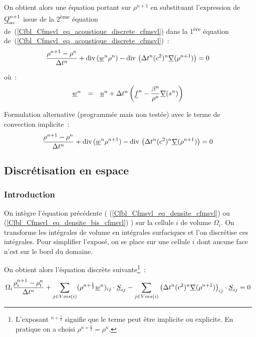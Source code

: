 On obtient alors une équation
portant sur $\rho^{n+1}$ en substituant l'expression de $\underline{Q}_{ac}^{n+1}$
issue de la 2\textsuperscript{ème} équation
de~(\ref{Cfbl_Cfmsvl_eq_acoustique_discrete_cfmsvl})
dans la 1\textsuperscript{ère} équation
de~(\ref{Cfbl_Cfmsvl_eq_acoustique_discrete_cfmsvl})~:
\begin{equation}\label{Cfbl_Cfmsvl_eq_densite_cfmsvl}
\displaystyle\frac{\rho^{n+1}-\rho^n}{\Delta t^n}
+\text{div}\,(\underline{w}^n \rho^n)
-\text{div}\,\left(\Delta t^n (c^2)^n \underline{\nabla}(\rho^{n+1})\right) = 0
\end{equation}

où~:
\begin{equation}
\begin{array}{lll}
\underline{w}^n&=&  \underline{u}^n + \Delta t^n
\displaystyle\left(\underline{f}^n-\frac{\beta^n}{\rho^n}\underline{\nabla}(s^n)\right)
\end{array}
\end{equation}

Formulation alternative (programmée mais non testée)
avec le terme de convection implicite~:
\begin{equation}\label{Cfbl_Cfmsvl_eq_densite_bis_cfmsvl}
\displaystyle\frac{\rho^{n+1}-\rho^n}{\Delta t^n}
+\text{div}\,(\underline{w}^n \rho^{n+1})
-\text{div}\,\left(\Delta t^n (c^2)^n \underline{\nabla}(\rho^{n+1})\right) = 0
\end{equation}


\subsection*{Discrétisation en espace}


\subsubsection*{Introduction}

On intègre l'équation précédente ( (\ref{Cfbl_Cfmsvl_eq_densite_cfmsvl})
ou (\ref{Cfbl_Cfmsvl_eq_densite_bis_cfmsvl}) ) sur la cellule $i$ de volume $\Omega_i$.
On transforme les intégrales de volume en intégrales surfaciques
et l'on discrétise ces intégrales. Pour simplifier l'exposé, on se
place sur une cellule $i$ dont aucune face n'est sur le bord du domaine.

On obtient alors l'équation discrète
suivante\footnote{L'exposant $^{n+\frac{1}{2}}$ signifie que le terme
peut être implicite ou explicite. En pratique on a choisi
$\rho^{n+\frac{1}{2}} = \rho^{n}$.}~:
\begin{equation}\label{Cfbl_Cfmsvl_eq_densite_discrete_cfmsvl}
\Omega_i \displaystyle\frac{\rho_i^{n+1}-\rho_i^n}{\Delta t^n}
+\sum\limits_{j\in Vois(i)}(\rho^{n+\frac{1}{2}} \underline{w}^n)_{ij} \cdot \underline{S}_{ij}
-\sum\limits_{j\in Vois(i)} \left(\Delta t^n (c^2)^n
\underline{\nabla}(\rho^{n+1})\right)_{ij} \cdot \underline{S}_{ij}
= 0
\end{equation}

